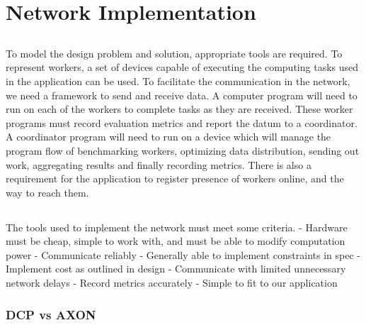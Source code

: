 \documentclass[../mthe-493-final-project.tex]{subfiles}
\begin{document}
    \chapter{Network Implementation}
    \label{ch:network-implementation}

    \section{}
    To model the design problem and solution, appropriate tools are required. To represent workers, a set of devices capable of executing the computing tasks used in the application can be used. To facilitate the communication in the network, we need a framework to send and receive data. A computer program will need to run on each of the workers to complete tasks as they are received. These worker programs must record evaluation metrics and report the datum to a coordinator. A coordinator program will need to run on a device which will manage the program flow of benchmarking workers, optimizing data distribution, sending out work, aggregating results and finally recording metrics. There is also a requirement for the application to register presence of workers online, and the way to reach them.

    \section{}

    The tools used to implement the network must meet some criteria.
    - Hardware must be cheap, simple to work with, and must be able to modify computation power
    - Communicate reliably
    - Generally able to implement constraints in spec
    - Implement cost as outlined in design
    - Communicate with limited unnecessary network delays
    - Record metrics accurately
    - Simple to fit to our application

    \subsection{DCP vs AXON}
\end{document}
